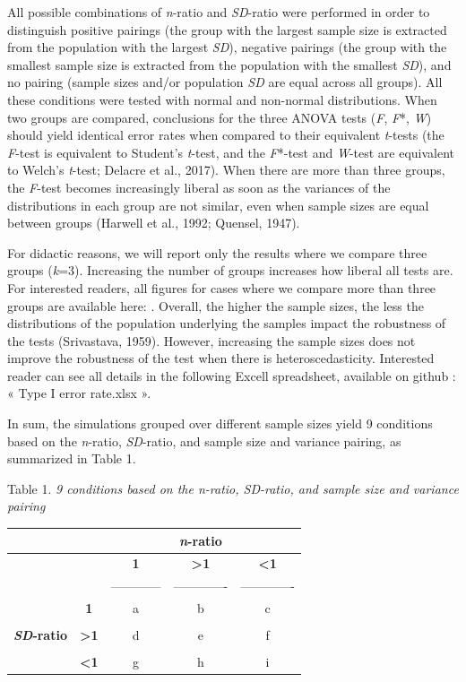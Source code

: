 \documentclass[man,floatsintext]{apa6}
\begin{document}
All possible combinations of \emph{n}-ratio and \emph{SD}-ratio were performed in order to distinguish positive pairings (the group with the largest sample size is extracted from the population with the largest \emph{SD}), negative pairings (the group with the smallest sample size is extracted from the population with the smallest \emph{SD}), and no pairing (sample sizes and/or population \emph{SD} are equal across all groups). All these conditions were tested with normal and non-normal distributions. When two groups are compared, conclusions for the three ANOVA tests (\emph{F}, \emph{F}*, \emph{W}) should yield identical error rates when compared to their equivalent \emph{t}-tests (the \emph{F}-test is equivalent to Student's \emph{t}-test, and the \emph{F}*-test and \emph{W}-test are equivalent to Welch's \emph{t}-test; Delacre et al., 2017). When there are more than three groups, the \emph{F}-test becomes increasingly liberal as soon as the variances of the distributions in each group are not similar, even when sample sizes are equal between groups (Harwell et al., 1992; Quensel, 1947).

For didactic reasons, we will report only the results where we compare three groups (\emph{k}=3). Increasing the number of groups increases how liberal all tests are. For interested readers, all figures for cases where we compare more than three groups are available here: . Overall, the higher the sample sizes, the less the distributions of the population underlying the samples impact the robustness of the tests (Srivastava, 1959). However, increasing the sample sizes does not improve the robustness of the test when there is heteroscedasticity. Interested reader can see all details in the following Excell spreadsheet, available on github : « Type I error rate.xlsx ».

In sum, the simulations grouped over different sample sizes yield 9 conditions based on the \emph{n}-ratio, \emph{SD}-ratio, and sample size and variance pairing, as summarized in Table 1.

Table 1.
\emph{9 conditions based on the n-ratio, SD-ratio, and sample size and variance pairing}

\begin{longtable}[]{@{}ccccc@{}}
\toprule
& & & \textbf{\emph{n}-ratio} &\tabularnewline
\midrule
\endhead
& & \textbf{1} & \textbf{\textgreater{}1} & \textbf{\textless{}1}\tabularnewline
& & ------------ & ------------- & -------------\tabularnewline
& \textbf{1} & a & b & c\tabularnewline
& & & &\tabularnewline
\textbf{\emph{SD}-ratio} & \textbf{\textgreater{}1} & d & e & f\tabularnewline
& & & &\tabularnewline
& \textbf{\textless{}1} & g & h & i\tabularnewline
\bottomrule
\end{longtable}
\end{document}
